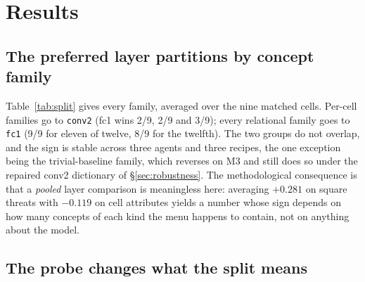 \documentclass{article}
\begin{document}
\section{Results}
\label{sec:results}

\subsection{The preferred layer partitions by concept family}
\label{sec:partition}

\begin{table}[t]
  \centering
  \caption{Best-latent MCC by concept family, averaged over nine matched
    (agent $\times$ recipe) cells; $\Delta = \text{fc1} - \text{conv2}$. ``fc1
    wins'' counts cells with $\Delta>0$. The partition is total: all fifteen
    cell-averaged gaps point the predicted way, the trivial-baseline family
    only marginally ($-0.008$).
    $\ddagger$ base rate far from $p_{\text{ref}}$; read on raw MCC.}
  \label{tab:split}
  \small
  
\end{table}

Table~\ref{tab:split} gives every family, averaged over the nine matched cells.
Per-cell families go to \texttt{conv2} (fc1 wins 2/9, 2/9 and 3/9); every
relational family goes to \texttt{fc1} (9/9 for eleven of twelve, 8/9 for the
twelfth). The two groups do not overlap, and the sign is stable across three
agents and three recipes, the one exception being the trivial-baseline family,
which reverses on M3 and still does so under the repaired conv2 dictionary of
\S\ref{sec:robustness}. The methodological consequence is that a \emph{pooled}
layer comparison is meaningless here: averaging $+0.281$ on square threats with
$-0.119$ on cell attributes yields a number whose sign depends on how many
concepts of each kind the menu happens to contain, not on anything about the
model.

\subsection{The probe changes what the split means}
\label{sec:availability}

\begin{table}[t]
  \centering
  \caption{Availability (linear probe) vs.\ isolation (best latent) on state
    threats, standardised to $p_{\text{ref}}=0.025$. conv2 is equally or more
    linearly available in 11 of 12 cells, while fc1 isolates
    $1.4$--$4.8\times$ more.}
  \label{tab:avail}
  \small
  
\end{table}
\end{document}
